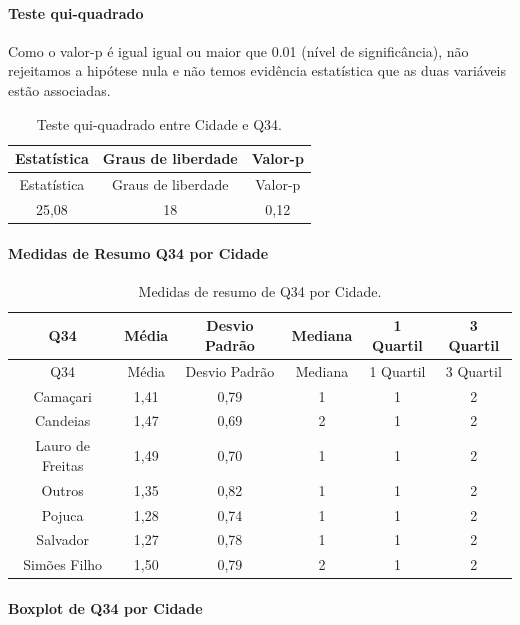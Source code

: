 \documentclass[]{article}
\let\oldparagraph\paragraph
\renewcommand{\paragraph}[1]{\oldparagraph{#1}\mbox{}}
\begin{document}
\hypertarget{teste-qui-quadrado-102}{%
\paragraph{Teste qui-quadrado}\label{teste-qui-quadrado-102}}

Como o valor-p é igual igual ou maior que 0.01 (nível de significância), não rejeitamos a hipótese nula e não temos evidência estatística que as duas variáveis estão associadas.

\begin{longtable}[]{@{}ccc@{}}
\caption{\label{tab:unnamed-chunk-1195}Teste qui-quadrado entre Cidade e Q34.}\tabularnewline
\toprule
Estatística & Graus de liberdade & Valor-p\tabularnewline
\midrule
\endfirsthead
\toprule
Estatística & Graus de liberdade & Valor-p\tabularnewline
\midrule
\endhead
25,08 & 18 & 0,12\tabularnewline
\bottomrule
\end{longtable}

\cleardoublepage

\hypertarget{medidas-de-resumo-q34-por-cidade}{%
\paragraph{Medidas de Resumo Q34 por Cidade}\label{medidas-de-resumo-q34-por-cidade}}

\begin{longtable}[]{@{}cccccc@{}}
\caption{\label{tab:unnamed-chunk-1196}Medidas de resumo de Q34 por Cidade.}\tabularnewline
\toprule
Q34 & Média & Desvio Padrão & Mediana & 1 Quartil & 3 Quartil\tabularnewline
\midrule
\endfirsthead
\toprule
Q34 & Média & Desvio Padrão & Mediana & 1 Quartil & 3 Quartil\tabularnewline
\midrule
\endhead
Camaçari & 1,41 & 0,79 & 1 & 1 & 2\tabularnewline
Candeias & 1,47 & 0,69 & 2 & 1 & 2\tabularnewline
Lauro de Freitas & 1,49 & 0,70 & 1 & 1 & 2\tabularnewline
Outros & 1,35 & 0,82 & 1 & 1 & 2\tabularnewline
Pojuca & 1,28 & 0,74 & 1 & 1 & 2\tabularnewline
Salvador & 1,27 & 0,78 & 1 & 1 & 2\tabularnewline
Simões Filho & 1,50 & 0,79 & 2 & 1 & 2\tabularnewline
\bottomrule
\end{longtable}

\hypertarget{boxplot-de-q34-por-cidade}{%
\paragraph{Boxplot de Q34 por Cidade}\label{boxplot-de-q34-por-cidade}}
\end{document}
